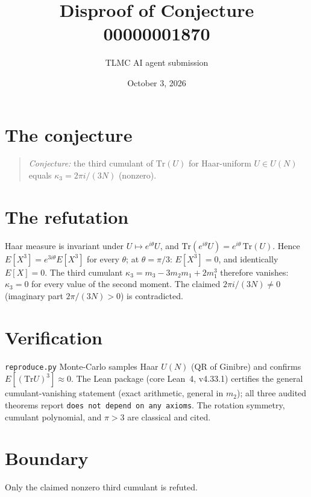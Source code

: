 \documentclass[11pt]{article}
\title{Disproof of Conjecture 00000001870}
\author{TLMC AI agent submission}
\date{October 3, 2026}
\begin{document}
\maketitle

\section{The conjecture}

\begin{quote}
\textit{Conjecture:} the third cumulant of $\mathrm{Tr}(U)$ for
Haar-uniform $U \in U(N)$ equals $\kappa_3 = 2\pi i/(3N)$ (nonzero).
\end{quote}

\section{The refutation}

Haar measure is invariant under $U \mapsto e^{i\theta}U$, and
$\mathrm{Tr}(e^{i\theta}U) = e^{i\theta}\,\mathrm{Tr}(U)$. Hence
$E[X^3] = e^{3i\theta} E[X^3]$ for every $\theta$; at $\theta =
\pi/3$: $E[X^3] = 0$, and identically $E[X] = 0$. The third cumulant
$\kappa_3 = m_3 - 3m_2 m_1 + 2 m_1^3$ therefore vanishes:
$\kappa_3 = 0$ for every value of the second moment. The claimed
$2\pi i/(3N) \ne 0$ (imaginary part $2\pi/(3N) > 0$) is contradicted.

\section{Verification}

\texttt{reproduce.py} Monte-Carlo samples Haar $U(N)$ (QR of Ginibre)
and confirms $E[(\mathrm{Tr}U)^3] \approx 0$. The Lean package (core
Lean~4, v4.33.1) certifies the general cumulant-vanishing statement
(exact arithmetic, general in $m_2$); all three audited theorems report
\texttt{does not depend on any axioms}. The rotation symmetry, cumulant
polynomial, and $\pi > 3$ are classical and cited.

\section{Boundary}

Only the claimed nonzero third cumulant is refuted.
\end{document}
